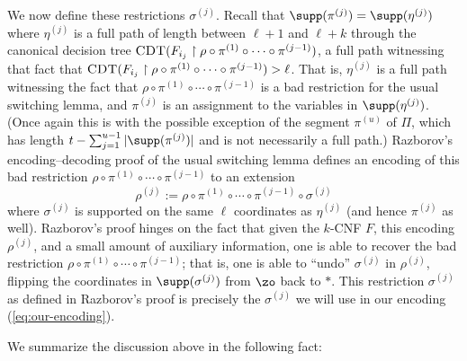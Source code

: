 \documentclass[11pt]{article}
\numberwithin{equation}{section}
\theoremstyle{definition}
\theoremstyle{plain}
\theoremstyle{plain}
\newcommand{\uhr}{\upharpoonright}
\newcommand{\CDT}{\textsc{CDT}}
\begin{document}
We now define these restrictions $\sigma^{(j)}$. Recall that $\supp(\pi^{(j)}) = \supp(\eta^{(j)})$ where $\eta^{(j)}$ is a full path of length between $\ell+1$ and $\ell+k$ through the canonical decision tree $\CDT(F_{i_j} \uhr \rho \circ \pi^{(1)}\circ\cdots\circ \pi^{(j-1)})$, a full path witnessing that fact that $\CDT(F_{i_j} \uhr \rho \circ \pi^{(1)}\circ\cdots\circ \pi^{(j-1)}) > \ell$. That is, $\eta^{(j)}$ is a full path witnessing the fact that $\rho \circ \pi^{(1)}\circ\cdots\circ \pi^{(j-1)}$ is a bad restriction for the usual switching lemma, and $\pi^{(j)}$ is an assignment to the variables in $\supp(\eta^{(j)})$. (Once again this is with the possible exception of the segment $\pi^{(u)}$ of $\Pi$, which has length $t - \sum_{j=1}^{u-1} |\supp(\pi^{(j)})|$ and is not necessarily a full path.) Razborov's encoding--decoding proof of the usual switching lemma defines an encoding of this bad restriction $\rho \circ \pi^{(1)}\circ\cdots\circ \pi^{(j-1)}$ to an extension 
\[ \rho^{(j)} := \rho\circ \pi^{(1)} \circ \cdots \circ \pi^{(j-1)} \circ \sigma^{(j)} \] 
where $\sigma^{(j)}$ is supported on the same $\ell$ coordinates as $\eta^{(j)}$ (and hence $\pi^{(j)}$ as well). Razborov's proof hinges on the fact that given the $k$-CNF $F$, this encoding $\rho^{(j)}$, and a small amount of auxiliary information, one is able  to recover the bad restriction $\rho\circ \pi^{(1)}\circ\cdots\circ \pi^{(j-1)}$; that is, one is able to ``undo'' $\sigma^{(j)}$ in $\rho^{(j)}$, flipping the coordinates in $\supp(\sigma^{(j)})$ from $\zo$ back to $\ast$.  This restriction $\sigma^{(j)}$ as defined in Razborov's proof is precisely the $\sigma^{(j)}$ we will use in our encoding (\ref{eq:our-encoding}). 



We summarize the discussion above in the following fact: 
\end{document}
